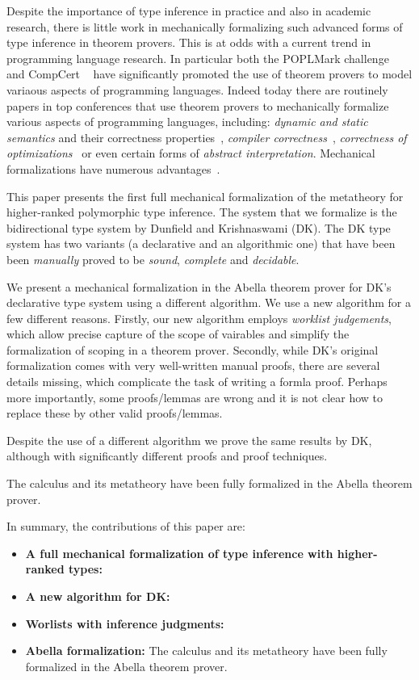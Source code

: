 Despite the importance of type inference in practice and also in
academic research, there is little work in mechanically formalizing
such advanced forms of type inference in theorem provers. This is at
odds with a current trend in programming language research. In
particular both the POPLMark challenge~\cite{} and CompCert ~\cite{}
have significantly promoted the use of theorem provers to model
variaous aspects of programming languages. Indeed today there are
routinely papers in top conferences that use theorem provers to
mechanically formalize various aspects of programming languages,
including: \emph{dynamic and static semantics} and their
correctness properties~\cite{}, \emph{compiler correctness}~\cite{},
\emph{correctness of optimizations}~\cite{} or even certain forms of
\emph{abstract interpretation}. Mechanical formalizations have
numerous advantages~\cite{read to make sure I do not miss any!}. 

This paper presents the first full mechanical formalization of the metatheory for
higher-ranked polymorphic type inference. The system that we formalize
is the bidirectional type system by Dunfield and
Krishnaswami (DK). The DK type system has two variants (a declarative
and an algorithmic one) that have been been \emph{manually} proved to be
\emph{sound}, \emph{complete} and \emph{decidable}. 

We present 
a mechanical formalization in the Abella theorem prover 
for DK's declarative type system using a different algorithm. We use a
new algorithm for a few different reasons. Firstly, our new algorithm
employs \emph{worklist judgements}, which allow precise capture of the
scope of vairables and simplify the formalization of scoping in a
theorem prover. Secondly, while DK's original formalization comes with very
well-written manual proofs, there are several details missing,
which complicate the task of writing a formla proof. 
Perhaps more importantly, some proofs/lemmas are wrong and it is
not clear how to replace these by other valid proofs/lemmas. 

Despite the use of a different algorithm we prove the
same results by DK, although with significantly different proofs and
proof techniques.  

The calculus and its metatheory
have been fully formalized in the Abella theorem prover\cite{AbellaDesc}. %

In summary, the contributions of this paper are:

\begin{itemize}

\item {\bf A full mechanical formalization of type inference with
    higher-ranked types:}

\item {\bf A new algorithm for DK:}

\item {\bf Worlists with inference judgments:}

\item {\bf Abella formalization:} The calculus and its metatheory
have been fully formalized in the Abella theorem prover\cite{AbellaDesc}.

\end{itemize}